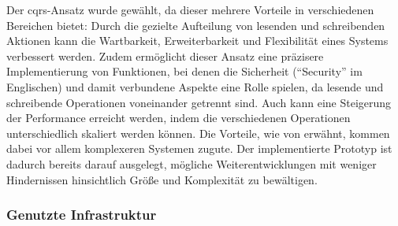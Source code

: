 \documentclass[a4paper,12pt,twoside]{scrreprt}
\begin{document}
Der \ac{cqrs}-Ansatz wurde gewählt, da dieser mehrere Vorteile in verschiedenen Bereichen bietet: Durch die gezielte Aufteilung von lesenden und schreibenden Aktionen kann die Wartbarkeit, Erweiterbarkeit und Flexibilität eines Systems verbessert werden. Zudem ermöglicht dieser Ansatz eine präzisere Implementierung von Funktionen, bei denen die Sicherheit (\enquote{Security} im Englischen) und damit verbundene Aspekte eine Rolle spielen, da lesende und schreibende Operationen voneinander getrennt sind. Auch kann eine Steigerung der Performance erreicht werden, indem die verschiedenen Operationen unterschiedlich skaliert werden können. Die Vorteile, wie von \cite{ingeno_software_2018} erwähnt, kommen dabei vor allem komplexeren Systemen zugute. Der implementierte Prototyp ist dadurch bereits darauf ausgelegt, mögliche Weiterentwicklungen mit weniger Hindernissen hinsichtlich Größe und Komplexität zu bewältigen. \cite[240]{ingeno_software_2018}

\subsubsection*{Genutzte Infrastruktur}
\label{sub-sub-sec:backend-genutzte-infrastruktur}
\end{document}
